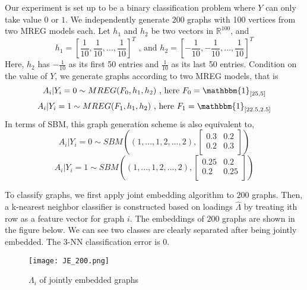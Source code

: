 \documentclass[10pt,journal,compsoc]{IEEEtran}
\begin{document}
\noindent Our experiment is set up to be a binary classification problem where $Y$ can only take value $0$ or $1$. We independently generate $200$ graphs with 100 vertices from two MREG models each. Let $h_1$ and $h_2$ be two vectors in $\mathbb{R}^{100}$, and \[h_1=[\frac{1}{10},\frac{1}{10},...,\frac{1}{10}]^T \text{ , and } h_2=[-\frac{1}{10},-\frac{1}{10},...,\frac{1}{10}]^T \] 
Here, $h_2$ has $-\frac{1}{10}$ as its first 50 entries and $\frac{1}{10}$ as its last 50 entries. Condition on the value of $Y$, we generate graphs according to two MREG models, that is 
\[A_i|Y_i=0 \sim MREG(F_0,h_1,h_2) \text{ , here } F_0= \mathbbm{1}_{[25,5]} \]
\[A_i|Y_i=1 \sim MREG(F_1,h_1,h_2) \text{ , here } F_1= \mathbbm{1}_{[22.5,2.5]} \]
In terms of SBM, this graph generation scheme is also equivalent to,
\[ A_i|Y_i=0 \sim  SBM((1,...,1,2,...,2),\begin{bmatrix} 0.3 & 0.2 \\ 0.2 & 0.3 \\ \end{bmatrix})  \]
\[ A_i|Y_i=1 \sim  SBM((1,...,1,2,...,2),\begin{bmatrix} 0.25 & 0.2 \\ 0.2 & 0.25 \\ \end{bmatrix})\]

\noindent To classify graphs, we first apply joint embedding algorithm to $200$ graphs. Then, a k-nearest neighbor classifier is constructed based on loadings $\hat{\Lambda}$ by treating ith row as a feature vector for graph $i$. The embeddings of $200$ graphs are shown in the figure below. We can see two classes are clearly separated after being jointly embedded. The 3-NN classification error is $0$. 

\begin{figure}[!htbp]
	\centering
	\texttt{[image: JE\_200.png]}
	\caption{$\Lambda_i$ of jointly embedded graphs}
\end{figure}
\end{document}
